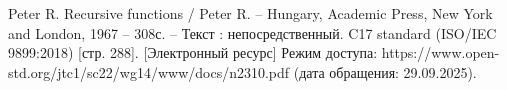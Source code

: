 \begin{thebibliography}{}
	 Peter R. Recursive functions / Peter R. -- Hungary, Academic Press, New York and London, 1967 -- 308с. -- Текст : непосредственный.
	 C17 standard (ISO/IEC 9899:2018) [стр. 288]. [Электронный ресурс] Режим доступа: https://www.open-std.org/jtc1/sc22/wg14/www/docs/n2310.pdf (дата обращения: 29.09.2025).
\end{thebibliography}
